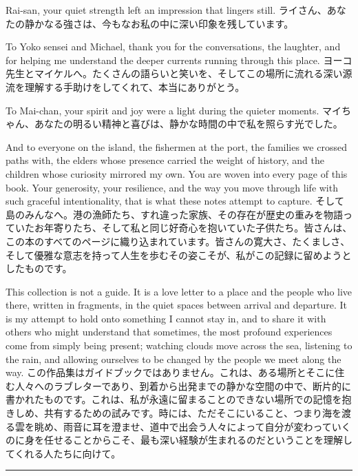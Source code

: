 \documentclass[
  letterpaper,
  oneside]{scrbook}
\begin{document}
Rai-san, your quiet strength left an impression that lingers still.
ライさん、あなたの静かなる強さは、今もなお私の中に深い印象を残しています。

To Yoko sensei and Michael, thank you for the conversations, the
laughter, and for helping me understand the deeper currents running
through this place.
ヨーコ先生とマイケルへ。たくさんの語らいと笑いを、そしてこの場所に流れる深い源流を理解する手助けをしてくれて、本当にありがとう。

To Mai-chan, your spirit and joy were a light during the quieter
moments.
マイちゃん、あなたの明るい精神と喜びは、静かな時間の中で私を照らす光でした。

And to everyone on the island, the fishermen at the port, the families
we crossed paths with, the elders whose presence carried the weight of
history, and the children whose curiosity mirrored my own. You are woven
into every page of this book. Your generosity, your resilience, and the
way you move through life with such graceful intentionality, that is
what these notes attempt to capture.
そして島のみんなへ。港の漁師たち、すれ違った家族、その存在が歴史の重みを物語っていたお年寄りたち、そして私と同じ好奇心を抱いていた子供たち。皆さんは、この本のすべてのページに織り込まれています。皆さんの寛大さ、たくましさ、そして優雅な意志を持って人生を歩むその姿こそが、私がこの記録に留めようとしたものです。

This collection is not a guide. It is a love letter to a place and the
people who live there, written in fragments, in the quiet spaces between
arrival and departure. It is my attempt to hold onto something I cannot
stay in, and to share it with others who might understand that
sometimes, the most profound experiences come from simply being present;
watching clouds move across the sea, listening to the rain, and allowing
ourselves to be changed by the people we meet along the way.
この作品集はガイドブックではありません。これは、ある場所とそこに住む人々へのラブレターであり、到着から出発までの静かな空間の中で、断片的に書かれたものです。これは、私が永遠に留まることのできない場所での記憶を抱きしめ、共有するための試みです。時には、ただそこにいること、つまり海を渡る雲を眺め、雨音に耳を澄ませ、道中で出会う人々によって自分が変わっていくのに身を任せることからこそ、最も深い経験が生まれるのだということを理解してくれる人たちに向けて。

\begin{center}\rule{0.5\linewidth}{0.5pt}\end{center}

\end{document}
